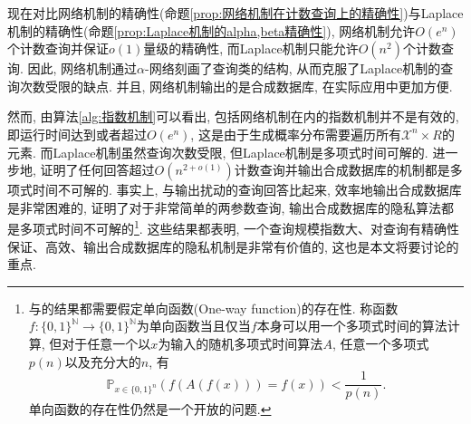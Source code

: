 现在对比网络机制的精确性(命题\ref{prop:网络机制在计数查询上的精确性})与Laplace机制的精确性(命题\ref{prop:Laplace机制的alpha,beta精确性}), 网络机制允许$O(e^n)$个计数查询并保证$o(1)$量级的精确性, 而Laplace机制只能允许$O(n^2)$个计数查询. 因此, 网络机制通过$\alpha$-网络刻画了查询类的结构, 从而克服了Laplace机制的查询次数受限的缺点. 并且, 网络机制输出的是合成数据库, 在实际应用中更加方便.

然而, 由算法\ref{alg:指数机制}可以看出, 包括网络机制在内的指数机制并不是有效的, 即运行时间达到或者超过$O(e^n)$, 这是由于生成概率分布需要遍历所有$\mathcal{X}^n\times R$的元素. 而Laplace机制虽然查询次数受限, 但Laplace机制是多项式时间可解的. 进一步地, \parencite{ullman2013answering}证明了任何回答超过$O\left(n^{2+o(1)}\right)$计数查询并输出合成数据库的机制都是多项式时间不可解的. 事实上, 与输出扰动的查询回答比起来, 效率地输出合成数据库是非常困难的, \parencite{ullman2011pcps}证明了对于非常简单的两参数查询, 输出合成数据库的隐私算法都是多项式时间不可解的\footnote{\parencite{ullman2011pcps}与\parencite{ullman2013answering}的结果都需要假定单向函数(One-way function)的存在性. 称函数$f\colon\{0, 1\}^{\mathbb N} \to \{0, 1\}^{\mathbb N}$为单向函数当且仅当$f$本身可以用一个多项式时间的算法计算, 但对于任意一个以$x$为输入的随机多项式时间算法$A$, 任意一个多项式$p(n)$以及充分大的$n$, 有
\[
  \mathbb P_{x\in\{0, 1\}^n} \left(f(A(f(x))) = f(x)\right) < \frac{1}{p(n)}.
\]
单向函数的存在性仍然是一个开放的问题.}. 这些结果都表明, 一个查询规模指数大、对查询有精确性保证、高效、输出合成数据库的隐私机制是非常有价值的, 这也是本文将要讨论的重点.

